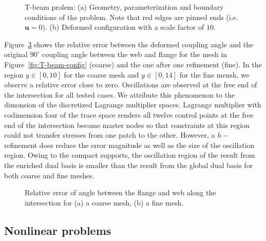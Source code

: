 \begin{figure}[h]
\begin{subfigure}[b]{0.54\textwidth}
		\caption{}\label{fig:T-beam-deform}
	\end{subfigure}
	\caption{T-beam prolem: (a) Geometry, parameterization and boundary conditions of the problem. Note that red edges are pinned ends (i.e. $\mathbf{u}=0$). (b) Deformed configuration with a scale factor of $10$. }
	\label{fig:T-beam}
\end{figure}


Figure~\ref{fig:T-beam_angle} shows the relative error between the deformed coupling angle and the original $90^\circ$ coupling angle between the web and flange for the mesh in Figure~\ref{fig:T-beam-config} (coarse) and the one after one refinement (fine). In the region $y\in\left[0, 10\right]$ for the coarse mesh and $y\in\left[0, 14\right]$ for the fine mensh, we observe a relative error close to zero. Oscillations are observed at the free end of the intersection for all tested cases. We attribute this phenomenon to the dimonsion of the discretized Lagrange multiplier spaces. Lagrange multiplier with codimension four of the trace space renders all twelve control points at the free end of the intersection become master nodes so that constraints at this region could not transfer stresses from one patch to the other. However, a $h-$refinement does reduce the error magnitude as well as the size of the oscillation region. Owing to the compact supports, the oscillation region of the result from the enriched \Bezier dual basis is smaller than the result from the global dual basis for both coarse and fine meshes. \par

\begin{figure}[h]
	\center
	\begin{subfigure}[b]{0.47\textwidth}
		\centering
		
		\caption{}
	\end{subfigure}
	\begin{subfigure}[b]{0.47\textwidth}
		\centering
		
		\caption{}
	\end{subfigure}
	\caption{Relative error of angle between the flange and web along the intersection for (a) a coarse mesh, (b) a fine mesh. }
	\label{fig:T-beam_angle}
\end{figure}
\FloatBarrier

\subsection{Nonlinear problems}

